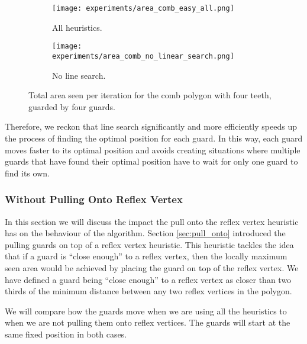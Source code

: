 \begin{figure}[h!]
    \centering
    \begin{subfigure}{0.45\textwidth}
        \texttt{[image: experiments/area\_comb\_easy\_all.png]}
        \caption{All heuristics.}
        \label{fig:no_line_search1}
    \end{subfigure}
    \begin{subfigure}{0.45\textwidth}
        \texttt{[image: experiments/area\_comb\_no\_linear\_search.png]}
        \caption{No line search.}
        \label{fig:no_line_search2}
    \end{subfigure}
    \caption{Total area seen per iteration for the comb polygon with four teeth, guarded by four guards.}
    \label{fig:no_line_search}
\end{figure}

Therefore, we reckon that line search significantly and more efficiently speeds up the process of finding the optimal position for each guard. In this way, each guard moves faster to its optimal position and avoids creating situations where multiple guards that have found their optimal position have to wait for only one guard to find its own.

\subsubsection{Without Pulling Onto Reflex Vertex}
In this section we will discuss the impact the pull onto the reflex vertex heuristic has on the behaviour of the algorithm. Section \ref{sec:pull_onto} introduced the pulling guards on top of a reflex vertex heuristic. This heuristic tackles the idea that if a guard is ``close enough'' to a reflex vertex, then the locally maximum seen area would be achieved by placing the guard on top of the reflex vertex. We have defined a guard being ``close enough'' to a reflex vertex as closer than two thirds of the minimum distance between any two reflex vertices in the polygon.

We will compare how the guards move when we are using all the heuristics to when we are not pulling them onto reflex vertices. The guards will start at the same fixed position in both cases.

